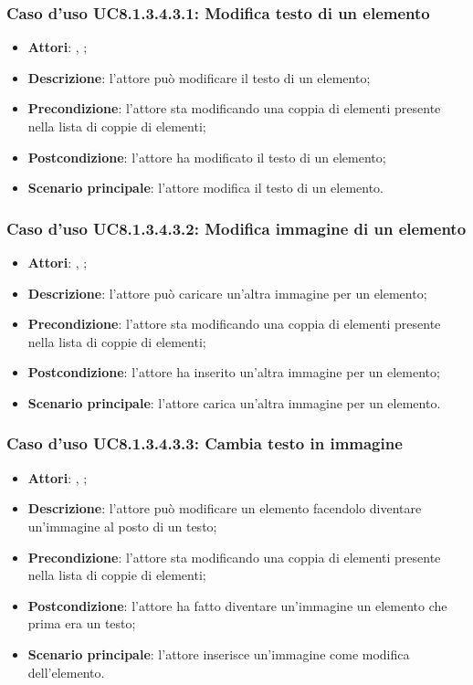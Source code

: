 		\subsubsection{Caso d'uso UC8.1.3.4.3.1: Modifica testo di un elemento}
		\label{UC8.1.3.4.3.1}
		\begin{itemize}
			\item \textbf{Attori}: \uau, \uaupro;
			\item \textbf{Descrizione}: l'attore può modificare il testo di un elemento;
			\item \textbf{Precondizione}: l'attore sta modificando una coppia di elementi presente nella lista di coppie di elementi; 
			\item \textbf{Postcondizione}: l'attore ha modificato il testo di un elemento;
			\item \textbf{Scenario principale}: l'attore modifica il testo di un elemento.  
		\end{itemize}
		
		\subsubsection{Caso d'uso UC8.1.3.4.3.2: Modifica immagine di un elemento}
		\label{UC8.1.3.4.3.2}
		\begin{itemize}
			\item \textbf{Attori}: \uau, \uaupro;
			\item \textbf{Descrizione}: l'attore può caricare un'altra immagine per un elemento;
			\item \textbf{Precondizione}: l'attore sta modificando una coppia di elementi presente nella lista di coppie di elementi; 
			\item \textbf{Postcondizione}: l'attore ha inserito un'altra immagine per un elemento;
			\item \textbf{Scenario principale}: l'attore carica un'altra immagine per un elemento.
		\end{itemize}
		
		\subsubsection{Caso d'uso UC8.1.3.4.3.3: Cambia testo in immagine}
		\label{UC8.1.3.4.3.3}
		\begin{itemize}
			\item \textbf{Attori}: \uau, \uaupro;
			\item \textbf{Descrizione}: l'attore può modificare un elemento facendolo diventare un'immagine al posto di un testo;
			\item \textbf{Precondizione}: l'attore sta modificando una coppia di elementi presente nella lista di coppie di elementi; 
			\item \textbf{Postcondizione}: l'attore ha fatto diventare un'immagine un elemento che prima era un testo;
			\item \textbf{Scenario principale}: l'attore inserisce un'immagine come modifica dell'elemento.  
		\end{itemize}
		
